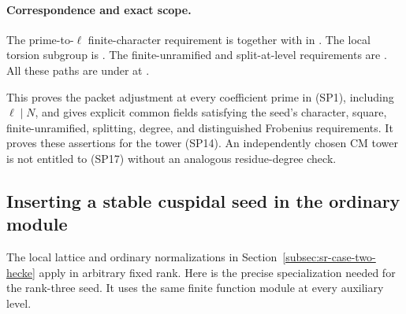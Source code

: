 \paragraph{Correspondence and exact scope.}
The prime-to-\(\ell\) finite-character requirement is
 together
with  in
.
The local torsion subgroup is
.
The finite-unramified and split-at-level requirements are
.
All these paths are under
at .

This proves the packet adjustment at every coefficient
prime in (SP1), including \(\ell\mid N\), and gives explicit
common fields satisfying the seed's character, square,
finite-unramified, splitting, degree, and distinguished
Frobenius requirements.
It proves these assertions for the tower (SP14).
An independently chosen CM tower is not entitled to
(SP17) without an analogous residue-degree check.


\subsection{Inserting a stable cuspidal seed in the ordinary module}
\label{subsec:sr-stable-seed-insertion}
The local lattice and ordinary normalizations in
Section~\ref{subsec:sr-case-two-hecke} apply in arbitrary fixed rank.
Here is the precise specialization needed for the rank-three seed.
It uses the same finite function module at every auxiliary level.

